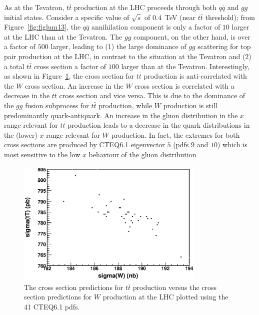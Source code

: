 \documentclass[12pt]{iopart}
\begin{document}
As at the Tevatron, $t\bar{t}$ production at the LHC proceeds through both $q\bar{q}$ and $gg$ initial states. 
Consider a specific value of $\sqrt{\hat{s}}$ of $0.4$~TeV (near $t\bar{t}$ threshold); from Figure~\ref{fig:figlum13}, the $q\bar{q}$ annihilation component
is only a factor of $10$ larger at the LHC than at the Tevatron.  The $gg$ component, on the other hand, is over a
factor of $500$ larger, leading to (1) the large dominance of $gg$ scattering for top pair production at the LHC, in contrast
to the situation at the Tevatron and (2) a total $t\bar{t}$ cross section a factor of $100$ larger than at the Tevatron. 
Interestingly, as shown in
Figure~\ref{fig:tT_W_LHC}, the cross section for $t\overline{t}$ production is anti-correlated with the $W$
cross section. An increase in the $W$ cross section is correlated with a decrease in the $t\overline{t}$ cross section and vice versa. This
is due to the dominance of the  $gg$ fusion subprocess for $t\bar{t}$ production,  while $W$ production is
still predominantly quark-antiquark. An increase in the gluon distribution in the $x$ range relevant for $t\overline{t}$
production leads to a decrease in  the quark  distributions in the (lower) $x$ range relevant  for $W$ production. In fact, 
the extremes for both cross sections are produced by CTEQ6.1 eigenvector $5$ (pdfs $9$ and $10$) which is most sensitive to the low
$x$ behaviour of the gluon distribution
%
\begin{figure}[t]
\begin{center}
\includegraphics[width=9cm]{tT_vs_W_lhc.eps}
\end{center}
\caption{
The cross section predictions for $t\overline{t}$ production versus  the cross section predictions for
$W$ production at the LHC plotted using the 41 CTEQ6.1 pdfs. } 
\label{fig:tT_W_LHC}
\end{figure}
%
\end{document}
